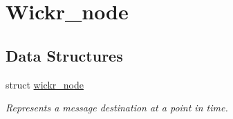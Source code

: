 \hypertarget{group__wickr__node}{}\section{Wickr\+\_\+node}
\label{group__wickr__node}
\subsection*{Data Structures}
\begin{DoxyCompactItemize}
\item 
struct \mbox{\hyperlink{structwickr__node}{wickr\+\_\+node}}
\begin{DoxyCompactList}\small\item\em Represents a message destination at a point in time. \end{DoxyCompactList}\end{DoxyCompactItemize}
